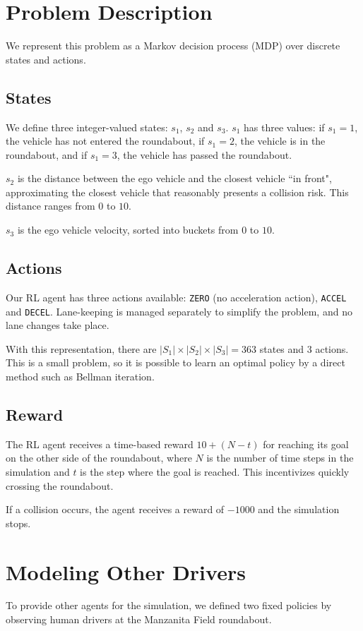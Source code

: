 \documentclass[conference]{IEEEtran}
\begin{document}
\section*{Problem Description}
We represent this problem as a Markov decision process (MDP) over discrete states and actions. 

\subsection*{States} We define three integer-valued states: $s_1$, $s_2$ and $s_3$.
$s_1$ has three values: if $s_1 = 1$, the vehicle has not entered the roundabout, if $s_1=2$, the vehicle is in the roundabout, and if $s_1=3$, the vehicle has passed the roundabout.
 
$s_2$ is the distance between the ego vehicle and the closest vehicle ``in front", approximating the closest vehicle that reasonably presents a collision risk. This distance ranges from $0$ to $10$. %

$s_3$ is the ego vehicle velocity, sorted into buckets from $0$ to $10$.

\subsection*{Actions} Our RL agent has three actions available: \verb|ZERO| (no acceleration action), \verb|ACCEL| and \verb|DECEL|. Lane-keeping is managed separately to simplify the problem, and no lane changes take place.

With this representation, there are $|S_1|\times|S_2|\times|S_3| = 363$ states and 3 actions. This is a small problem, so it is possible to learn an optimal policy by a direct method such as Bellman iteration.

\subsection*{Reward} The RL agent receives a time-based reward $10 + (N-t)$ for reaching its goal on the other side of the roundabout, where $N$ is the number of time steps in the simulation and $t$ is the step where the goal is reached. This incentivizes quickly crossing the roundabout.

If a collision occurs, the agent receives a reward of $-1000$ and the simulation stops.

\section*{Modeling Other Drivers}
To provide other agents for the simulation, we defined two fixed policies by observing human drivers at the Manzanita Field roundabout.
\end{document}
